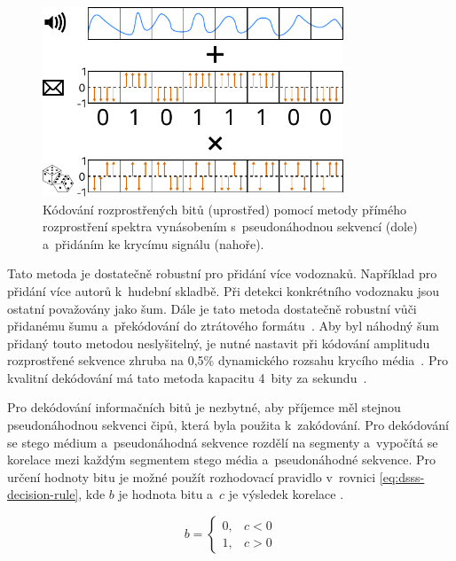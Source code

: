 \begin{figure}[hbt]
    \centering
    \includegraphics[width=0.8\textwidth]{obrazky/direct-sequence-spread-spectrum-diagram.pdf}
    \caption{Kódování rozprostřených bitů (uprostřed) pomocí metody přímého
    rozprostření spektra vynásobením s~pseudonáhodnou sekvencí (dole)
    a~přidáním ke krycímu signálu (nahoře).}
    \label{pic:dsss-spreading}
\end{figure}

Tato metoda je dostatečně robustní pro přidání více vodoznaků. Například pro
přidání více autorů k~hudební skladbě. Při detekci konkrétního vodoznaku jsou
ostatní považovány jako šum. Dále je tato metoda dostatečně robustní vůči
přidanému šumu a~překódování do ztrátového formátu~\cite{Boney1996}. Aby byl
náhodný šum přidaný touto metodou neslyšitelný, je nutné nastavit při kódování
amplitudu rozprostřené sekvence zhruba na 0,5\% dynamického rozsahu krycího
média~\cite{Bender1996}. Pro kvalitní dekódování má tato metoda kapacitu 4~bity
za sekundu~\cite{Bender1996}.

Pro dekódování informačních bitů je nezbytné, aby příjemce měl stejnou
pseudonáhodnou sekvenci čipů, která byla použita k~zakódování. Pro dekódování
se stego médium a~pseudonáhodná sekvence rozdělí na segmenty a~vypočítá se
korelace mezi každým segmentem stego média a~pseudonáhodné sekvence. Pro určení
hodnoty bitu je možné použít rozhodovací pravidlo v~rovnici
\ref{eq:dsss-decision-rule}, kde $b$ je hodnota bitu a~$c$ je výsledek korelace
\cite{Kuznetsov2022}.

\begin{equation}
    \label{eq:dsss-decision-rule}
    b = \left\{
        \begin{array}{rl}
            0, & c < 0 \\
            1, & c > 0
        \end{array}
    \right.
\end{equation}

